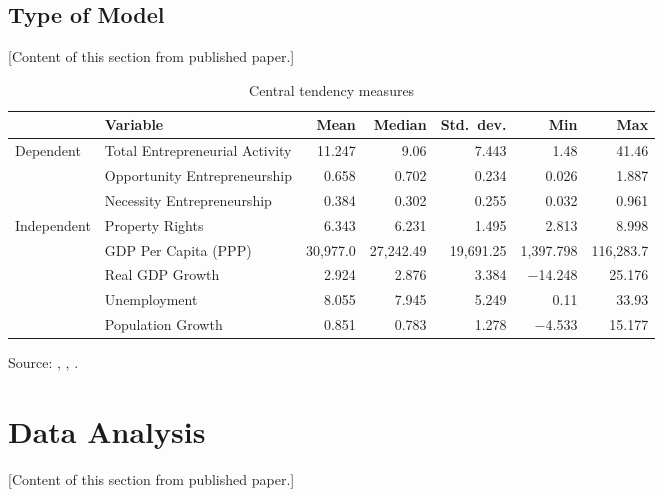 \documentclass[12pt]{article}
\begin{document}
\subsection{Type of Model}\label{subsec:type_of_model}

[Content of this section from published paper.]

\begin{table}[H]
    \centering
    \caption{Central tendency measures}
    \label{tab:central_tendency}
    \small
    \begin{tabular}{l l r r r r r}
        \toprule
        & \textbf{Variable} & \textbf{Mean} & \textbf{Median} & \textbf{Std.\ dev.} & \textbf{Min} & \textbf{Max} \\
        \midrule
        \multirow{3}{*}{Dependent}
        & Total Entrepreneurial Activity & 11.247 & 9.06 & 7.443 & 1.48 & 41.46 \\
        & Opportunity Entrepreneurship & 0.658 & 0.702 & 0.234 & 0.026 & 1.887 \\
        & Necessity Entrepreneurship & 0.384 & 0.302 & 0.255 & 0.032 & 0.961 \\
        \midrule
        \multirow{5}{*}{Independent}
        & Property Rights & 6.343 & 6.231 & 1.495 & 2.813 & 8.998 \\
        & GDP Per Capita (PPP) & 30,977.0 & 27,242.49 & 19,691.25 & 1,397.798 & 116,283.7 \\
        & Real GDP Growth & 2.924 & 2.876 & 3.384 & $-$14.248 & 25.176 \\
        & Unemployment & 8.055 & 7.945 & 5.249 & 0.11 & 33.93 \\
        & Population Growth & 0.851 & 0.783 & 1.278 & $-$4.533 & 15.177 \\
        \bottomrule
    \end{tabular}
    \par\smallskip
    \footnotesize Source: \citet{GEM}, \citet{Gwartney2021}, \citet{WorldBank}.
\end{table}

\section{Data Analysis}\label{sec:data_analysis}

[Content of this section from published paper.]
\end{document}
